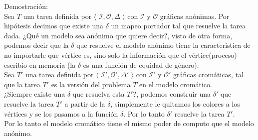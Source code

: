 \documentclass{article}
\begin{document}
\begin{enumerate}
{    Demostración:\\
    Sea $T$ una tarea definida por $\langle$ $\mathcal{I},\mathcal{O},\Delta$ $\rangle$ con $\mathcal{I}$
    y $\mathcal{O}$ gráficas anónimas. Por hipótesis decimos que existe una $\delta$ un mapeo portador
    tal que resuelve la tarea dada.
    ¿Qué un modelo sea anónimo que quiere decir?, visto de otra forma, podemos decir que la $\delta$ que
    resuelve el modelo anónimo tiene la caracteristica de no importarle que vértice es, sino solo la 
    información que el vértice(proceso) escribio en memoria (la $\delta$ es una función de equidad de género).\\
    Sea $T'$ una tarea definida por $\langle$ $\mathcal{I}',\mathcal{O}',\Delta'$ $\rangle$ con $\mathcal{I}'$
    y $\mathcal{O}'$ gráficas cromáticas, tal que la tarea $T'$ es la versión del problema $T$ en el modelo 
    cromático.\\
    ¿Siempre existe una $\delta$ que resuelva esta $T'$?, podemos construir una $\delta'$ que resuelve la tarea $T'$
    a partir de la $\delta$, simplemente le quitamos los colores a los vértices y se los pasamos a la función $\delta$.
    Por lo tanto $\delta'$ resuelve la tarea $T'$.\\
    Por lo tanto el modelo cromático tiene el mismo poder de computo que el modelo anónimo.
    
  }
\end{enumerate}
\end{document}
